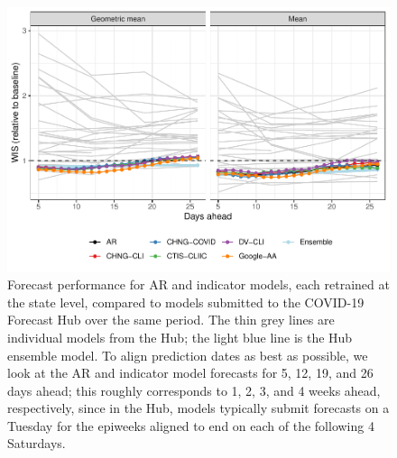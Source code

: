 \clearpage

\begin{figure}

{\centering \includegraphics[width=\textwidth]{fig/compare-states-to-hub} 

}

\caption{Forecast performance for AR and indicator models, each retrained at the state level, compared to models submitted to the COVID-19 Forecast Hub over the same period. The thin grey lines are individual models from the Hub; the light blue line is the Hub ensemble model. To align prediction dates as best as possible, we look at the AR and indicator model forecasts for 5, 12, 19, and 26 days ahead; this roughly corresponds to 1, 2, 3, and 4 weeks ahead, respectively, since in the Hub, models typically submit forecasts on a Tuesday for the epiweeks aligned to end on each of the following 4 Saturdays.}\label{fig:compare-to-hub}
\end{figure}

\clearpage

